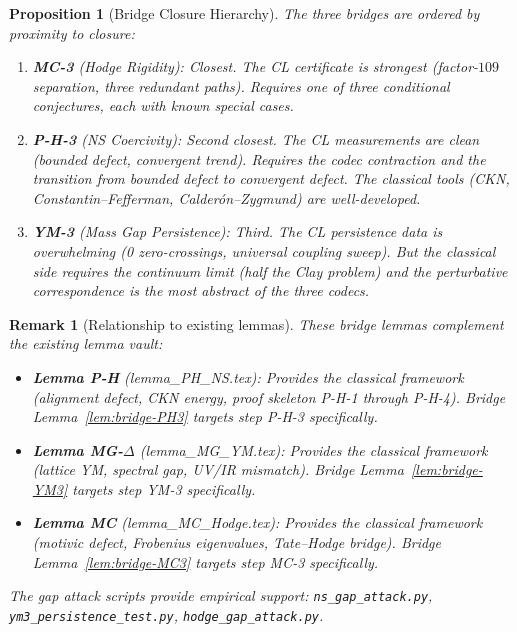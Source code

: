 \documentclass[11pt]{article}
\newtheorem{proposition}[lemma]{Proposition}
\newtheorem{remark}[lemma]{Remark}
\theoremstyle{definition}
\begin{document}
\begin{proposition}[Bridge Closure Hierarchy]
\label{prop:hierarchy}
The three bridges are ordered by proximity to closure:
\begin{enumerate}
  \item \textbf{MC-3} (Hodge Rigidity): Closest.
    The CL certificate is strongest (factor-$109$ separation, three redundant paths).
    Requires one of three conditional conjectures, each with known special cases.

  \item \textbf{P-H-3} (NS Coercivity): Second closest.
    The CL measurements are clean (bounded defect, convergent trend).
    Requires the codec contraction and the transition from bounded defect to
    convergent defect.  The classical tools (CKN, Constantin--Fefferman,
    Calder\'on--Zygmund) are well-developed.

  \item \textbf{YM-3} (Mass Gap Persistence): Third.
    The CL persistence data is overwhelming (0 zero-crossings, universal coupling sweep).
    But the classical side requires the continuum limit (half the Clay problem)
    and the perturbative correspondence is the most abstract of the three codecs.
\end{enumerate}
\end{proposition}

\begin{remark}[Relationship to existing lemmas]
\label{rem:existing}
These bridge lemmas complement the existing lemma vault:
\begin{itemize}
  \item \textbf{Lemma P-H} (lemma\_PH\_NS.tex): Provides the classical framework
    (alignment defect, CKN energy, proof skeleton P-H-1 through P-H-4).
    Bridge Lemma~\ref{lem:bridge-PH3} targets step P-H-3 specifically.
  \item \textbf{Lemma MG-$\Delta$} (lemma\_MG\_YM.tex): Provides the classical
    framework (lattice YM, spectral gap, UV/IR mismatch).
    Bridge Lemma~\ref{lem:bridge-YM3} targets step YM-3 specifically.
  \item \textbf{Lemma MC} (lemma\_MC\_Hodge.tex): Provides the classical framework
    (motivic defect, Frobenius eigenvalues, Tate--Hodge bridge).
    Bridge Lemma~\ref{lem:bridge-MC3} targets step MC-3 specifically.
\end{itemize}
The gap attack scripts provide empirical support:
\texttt{ns\_gap\_attack.py}, \texttt{ym3\_persistence\_test.py},
\texttt{hodge\_gap\_attack.py}.
\end{remark}
\end{document}
